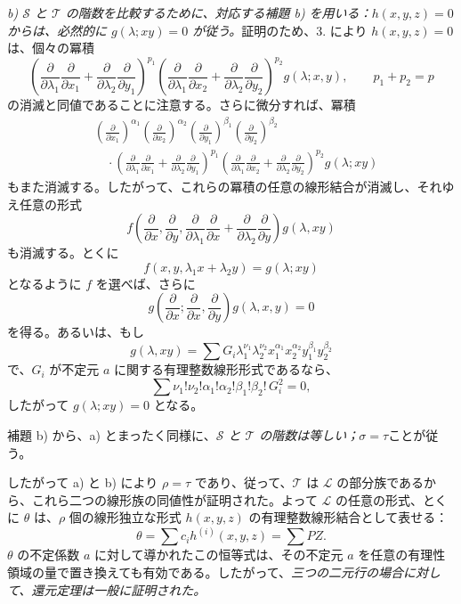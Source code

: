 \documentclass[11pt]{article}
\begin{document}
\emph{b) $\mathcal S$ と $\mathcal T$ の階数を比較するために、対応する補題 b) を用いる：$h(x,y,z)=0$ からは、必然的に $g(\lambda;xy)=0$ が従う。}証明のため、3. により $h(x,y,z)=0$ は、個々の冪積
\[
 \left(\frac{\partial}{\partial\lambda_1}\frac{\partial}{\partial x_1}
 +\frac{\partial}{\partial\lambda_2}\frac{\partial}{\partial y_1}\right)^{p_1}
 \left(\frac{\partial}{\partial\lambda_1}\frac{\partial}{\partial x_2}
 +\frac{\partial}{\partial\lambda_2}\frac{\partial}{\partial y_2}\right)^{p_2}g(\lambda;x,y),
 \qquad p_1+p_2=p
\]
の消滅と同値であることに注意する。さらに微分すれば、冪積
\[
\begin{aligned}
&\left(\frac{\partial}{\partial x_1}\right)^{\alpha_1}
 \left(\frac{\partial}{\partial x_2}\right)^{\alpha_2}
 \left(\frac{\partial}{\partial y_1}\right)^{\beta_1}
 \left(\frac{\partial}{\partial y_2}\right)^{\beta_2} \\
&\quad\cdot
 \left(\frac{\partial}{\partial\lambda_1}\frac{\partial}{\partial x_1}
 +\frac{\partial}{\partial\lambda_2}\frac{\partial}{\partial y_1}\right)^{p_1}
 \left(\frac{\partial}{\partial\lambda_1}\frac{\partial}{\partial x_2}
 +\frac{\partial}{\partial\lambda_2}\frac{\partial}{\partial y_2}\right)^{p_2}
 g(\lambda;xy)
\end{aligned}
\]
もまた消滅する。したがって、これらの冪積の任意の線形結合が消滅し、それゆえ任意の形式
\[
  f\left(\frac{\partial}{\partial x},\frac{\partial}{\partial y},
  \frac{\partial}{\partial\lambda_1}\frac{\partial}{\partial x}
  +\frac{\partial}{\partial\lambda_2}\frac{\partial}{\partial y}\right)g(\lambda,xy)
\]
も消滅する。とくに
\[
  f(x,y,\lambda_1x+\lambda_2y)=g(\lambda;xy)
\]
となるように $f$ を選べば、さらに
\[
  g\left(\frac{\partial}{\partial x};
    \frac{\partial}{\partial x},
    \frac{\partial}{\partial y}\right)g(\lambda,x,y)=0
\]
を得る。あるいは、もし
\[
  g(\lambda,xy)=\sum G_i\lambda_1^{\nu_1}\lambda_2^{\nu_2}
  x_1^{\alpha_1}x_2^{\alpha_2}y_1^{\beta_1}y_2^{\beta_2}
\]
で、$G_i$ が不定元 $a$ に関する有理整数線形形式であるなら、
\[
  \sum \nu_1!\nu_2!\alpha_1!\alpha_2!\beta_1!\beta_2!\,G_i^2=0,
\]
したがって $g(\lambda;xy)=0$ となる。

補題 b) から、a) とまったく同様に、\emph{$\mathcal S$ と $\mathcal T$ の階数は等しい；$\sigma=\tau$}ことが従う。

したがって a) と b) により $\rho=\tau$ であり、従って、$\mathcal T$ は $\mathcal L$ の部分族であるから、これら二つの線形族の同値性が証明された。よって $\mathcal L$ の任意の形式、とくに $\theta$ は、$\rho$ 個の線形独立な形式 $h(x,y,z)$ の有理整数線形結合として表せる：
\[
  \theta=\sum c_i h^{(i)}(x,y,z)=\sum PZ.
\]
$\theta$ の不定係数 $a$ に対して導かれたこの恒等式は、その不定元 $a$ を任意の有理性領域の量で置き換えても有効である。したがって、\emph{三つの二元行の場合に対して、還元定理は一般に証明された。}
\end{document}
